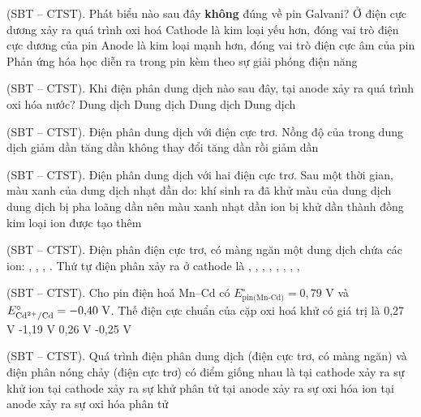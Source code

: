 \documentclass[11pt,a4paper]{article}
\def\loigiai#1{}
\begin{document}
\newpage

\begin{ex}
(SBT – CTST). Phát biểu nào sau đây \textbf{không} đúng về pin Galvani?
\choice
{Ở điện cực dương xảy ra quá trình oxi hoá}
{Cathode là kim loại yếu hơn, đóng vai trò điện cực dương của pin}
{Anode là kim loại mạnh hơn, đóng vai trò điện cực âm của pin}
{Phản ứng hóa học diễn ra trong pin kèm theo sự giải phóng điện năng}
\loigiai{}
\end{ex}

\begin{ex}
(SBT – CTST). Khi điện phân dung dịch nào sau đây, tại anode xảy ra quá trình oxi hóa nước?
\choice
{Dung dịch }
{Dung dịch }
{Dung dịch }
{Dung dịch }
\loigiai{}
\end{ex}

\begin{ex}
(SBT – CTST). Điện phân dung dịch  với điện cực trơ. Nồng độ của  trong dung dịch
\choice
{giảm dần}
{tăng dần}
{không thay đổi}
{tăng dần rồi giảm dần}
\loigiai{}
\end{ex}

\begin{ex}
(SBT – CTST). Điện phân dung dịch  với hai điện cực trơ. Sau một thời gian, màu xanh của dung dịch nhạt dần do:
\choice
{khí  sinh ra đã khử màu của dung dịch}
{dung dịch bị pha loãng dần nên màu xanh nhạt dần}
{ion  bị khử dần thành đồng kim loại}
{ion  được tạo thêm}
\loigiai{}
\end{ex}

\begin{ex}
(SBT – CTST). Điện phân điện cực trơ, có màng ngăn một dung dịch chứa các ion: , , , . Thứ tự điện phân xảy ra ở cathode là
\choice
{, , }
{, , }
{, , }
{, , }
\loigiai{}
\end{ex}

\begin{ex}
(SBT – CTST). Cho pin điện hoá Mn--Cd có $E^\circ_{\text{pin(Mn-Cd)}} = 0{,}79\text{ V}$ và $E^\circ_{\ce{Cd^2+/Cd}} = -0{,}40\text{ V}$. Thế điện cực chuẩn của cặp oxi hoá khử  có giá trị là
\choice
{0,27 V}
{-1,19 V}
{0,26 V}
{-0,25 V}
\loigiai{}
\end{ex}

\begin{ex}
(SBT – CTST). Quá trình điện phân dung dịch  (điện cực trơ, có màng ngăn) và điện phân  nóng chảy (điện cực trơ) có điểm giống nhau là
\choice
{tại cathode xảy ra sự khử ion }
{tại cathode xảy ra sự khử phân tử }
{tại anode xảy ra sự oxi hóa ion }
{tại anode xảy ra sự oxi hóa phân tử }
\loigiai{}
\end{ex}
\end{document}
